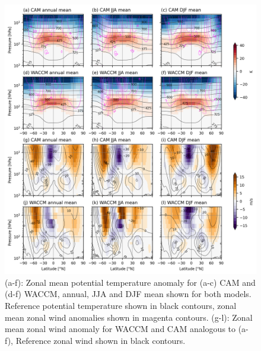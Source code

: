 \begin{figure}[H]
	\centering
	\includegraphics[width=0.95\linewidth]{images/th_U_full.png}
	\caption{(a-f): Zonal mean potential temperature anomaly for (a-c) CAM and (d-f) WACCM, annual, JJA and DJF mean shown for both models. Reference potential temperature shown in black contours, zonal mean zonal wind anomalies shown in magenta contours. (g-l): Zonal mean zonal wind anomaly for WACCM and CAM analogous to (a-f), Reference zonal wind shown in black contours.}
	\label{fig:th_U_full}
\end{figure}